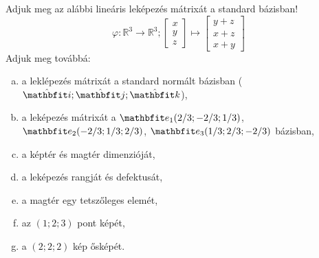 \documentclass[exercise]{math-standalone}
\begin{document}
\begin{exercise}{%
    Adjuk meg az alábbi lineáris leképezés mátrixát a standard bázisban!
  }
  \[
    \varphi: \mathbb R^3 \rightarrow \mathbb R^3;
    \begin{bmatrix}
      x \\ y \\ z
    \end{bmatrix} \mapsto \begin{bmatrix}
      y + z \\
      x + z \\
      x + y
    \end{bmatrix}
  \]
  Adjuk meg továbbá:
  \begin{enumerate}[a)]
    \item a leklépezés mátrixát a standard normált bázisban
          ($\uvec i; \uvec j; \uvec k$),
    \item a leképezés mátrixát a $\rvec e_1(2/3; -2/3; 1/3)$,
          $\rvec e_2 (-2/3; 1/3; 2/3)$, $\rvec e_3 (1/3; 2/3; -2/3)$ bázisban,
    \item a képtér és magtér dimenzióját,
    \item a leképezés rangját és defektusát,
    \item a magtér egy tetszőleges elemét,
    \item az $(1; 2; 3)$ pont képét,
    \item a $(2; 2; 2)$ kép ősképét.
  \end{enumerate}

\end{exercise}
\end{document}
